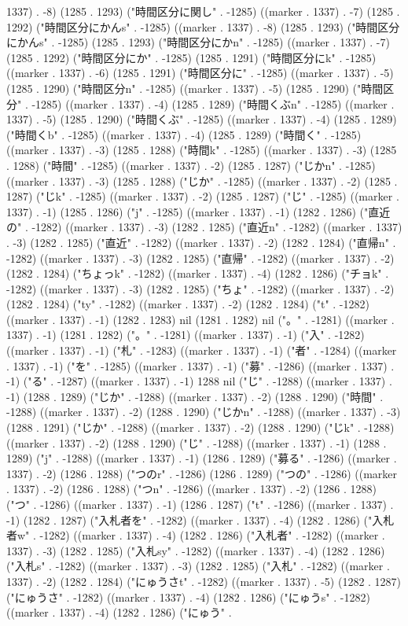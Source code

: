 1337) . -8) (1285 . 1293) ("時間区分に関し" . -1285) ((marker . 1337) . -7) (1285 . 1292) ("時間区分にかんs" . -1285) ((marker . 1337) . -8) (1285 . 1293) ("時間区分にかんs" . -1285) (1285 . 1293) ("時間区分にかn" . -1285) ((marker . 1337) . -7) (1285 . 1292) ("時間区分にか" . -1285) (1285 . 1291) ("時間区分にk" . -1285) ((marker . 1337) . -6) (1285 . 1291) ("時間区分に" . -1285) ((marker . 1337) . -5) (1285 . 1290) ("時間区分n" . -1285) ((marker . 1337) . -5) (1285 . 1290) ("時間区分" . -1285) ((marker . 1337) . -4) (1285 . 1289) ("時間くぶn" . -1285) ((marker . 1337) . -5) (1285 . 1290) ("時間くぶ" . -1285) ((marker . 1337) . -4) (1285 . 1289) ("時間くb" . -1285) ((marker . 1337) . -4) (1285 . 1289) ("時間く" . -1285) ((marker . 1337) . -3) (1285 . 1288) ("時間k" . -1285) ((marker . 1337) . -3) (1285 . 1288) ("時間" . -1285) ((marker . 1337) . -2) (1285 . 1287) ("じかn" . -1285) ((marker . 1337) . -3) (1285 . 1288) ("じか" . -1285) ((marker . 1337) . -2) (1285 . 1287) ("じk" . -1285) ((marker . 1337) . -2) (1285 . 1287) ("じ" . -1285) ((marker . 1337) . -1) (1285 . 1286) ("j" . -1285) ((marker . 1337) . -1) (1282 . 1286) ("直近の" . -1282) ((marker . 1337) . -3) (1282 . 1285) ("直近n" . -1282) ((marker . 1337) . -3) (1282 . 1285) ("直近" . -1282) ((marker . 1337) . -2) (1282 . 1284) ("直帰n" . -1282) ((marker . 1337) . -3) (1282 . 1285) ("直帰" . -1282) ((marker . 1337) . -2) (1282 . 1284) ("ちょっk" . -1282) ((marker . 1337) . -4) (1282 . 1286) ("チョk" . -1282) ((marker . 1337) . -3) (1282 . 1285) ("ちょ" . -1282) ((marker . 1337) . -2) (1282 . 1284) ("ty" . -1282) ((marker . 1337) . -2) (1282 . 1284) ("t" . -1282) ((marker . 1337) . -1) (1282 . 1283) nil (1281 . 1282) nil ("。" . -1281) ((marker . 1337) . -1) (1281 . 1282) ("。" . -1281) ((marker . 1337) . -1) ("入" . -1282) ((marker . 1337) . -1) ("札" . -1283) ((marker . 1337) . -1) ("者" . -1284) ((marker . 1337) . -1) ("を" . -1285) ((marker . 1337) . -1) ("募" . -1286) ((marker . 1337) . -1) ("る" . -1287) ((marker . 1337) . -1) 1288 nil ("じ" . -1288) ((marker . 1337) . -1) (1288 . 1289) ("じか" . -1288) ((marker . 1337) . -2) (1288 . 1290) ("時間" . -1288) ((marker . 1337) . -2) (1288 . 1290) ("じかn" . -1288) ((marker . 1337) . -3) (1288 . 1291) ("じか" . -1288) ((marker . 1337) . -2) (1288 . 1290) ("じk" . -1288) ((marker . 1337) . -2) (1288 . 1290) ("じ" . -1288) ((marker . 1337) . -1) (1288 . 1289) ("j" . -1288) ((marker . 1337) . -1) (1286 . 1289) ("募る" . -1286) ((marker . 1337) . -2) (1286 . 1288) ("つのr" . -1286) (1286 . 1289) ("つの" . -1286) ((marker . 1337) . -2) (1286 . 1288) ("つn" . -1286) ((marker . 1337) . -2) (1286 . 1288) ("つ" . -1286) ((marker . 1337) . -1) (1286 . 1287) ("t" . -1286) ((marker . 1337) . -1) (1282 . 1287) ("入札者を" . -1282) ((marker . 1337) . -4) (1282 . 1286) ("入札者w" . -1282) ((marker . 1337) . -4) (1282 . 1286) ("入札者" . -1282) ((marker . 1337) . -3) (1282 . 1285) ("入札sy" . -1282) ((marker . 1337) . -4) (1282 . 1286) ("入札s" . -1282) ((marker . 1337) . -3) (1282 . 1285) ("入札" . -1282) ((marker . 1337) . -2) (1282 . 1284) ("にゅうさt" . -1282) ((marker . 1337) . -5) (1282 . 1287) ("にゅうさ" . -1282) ((marker . 1337) . -4) (1282 . 1286) ("にゅうs" . -1282) ((marker . 1337) . -4) (1282 . 1286) ("にゅう" . 